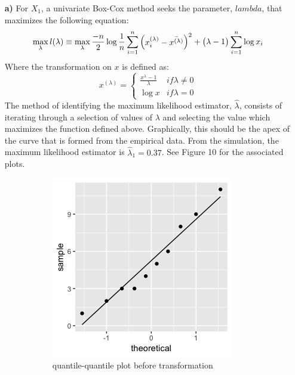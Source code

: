 \begin{enumerate}
	\item[\bf{a)}] For $X_1$, a univariate Box-Cox method seeks the parameter, $lambda$, that maximizes the following equation: $$\max_{\lambda} l(\lambda) \equiv \max_{\lambda} \frac{-n}{2} \log{\frac{1}{n} \sum_{i=1}^n \begin{pmatrix}x_i^{(\lambda)} - \bar{x^{(\lambda)}}\end{pmatrix}^2} + \begin{pmatrix}\lambda - 1\end{pmatrix}\sum_{i=1}^n \log{x_i}$$ Where the transformation on $x$ is defined as: $$x^{(\lambda)} = \left\{ \begin{array}{cl} \frac{x^{\lambda} - 1}{\lambda} & if \lambda \neq 0 \\ \log{x} & if \lambda = 0 \end{array} \right.$$ The method of identifying the maximum likelihood estimator, $\hat{\lambda}$, consists of iterating through a selection of values of $\lambda$ and selecting the value which maximizes the function defined above. Graphically, this should be the apex of the curve that is formed from the empirical data. From the simulation, the maximum likelihood estimator is $\hat{\lambda}_1 = 0.37$. See Figure 10 for the associated plots.
\begin{figure}[H]
\begin{subfigure}{.33\textwidth}
  \centering
	\includegraphics[width=.8\linewidth]{plot_4_30_a_qq.png}
  \caption{quantile-quantile plot before transformation}
  \label{fig:sfig1}
\end{subfigure}%
\begin{subfigure}{.33\textwidth}
  \centering

\end{subfigure}
\end{figure}
\end{enumerate}
